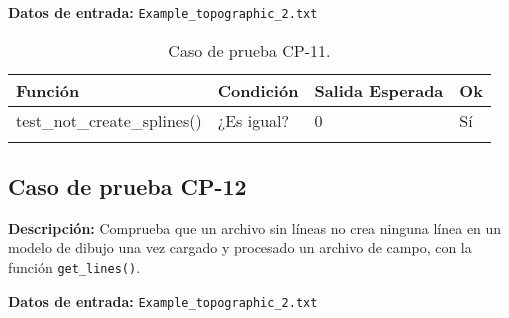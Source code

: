 \textbf{Datos de entrada:} \texttt{Example\_topographic\_2.txt}


\begin{longtable}[]{@{}llll@{}}
\toprule
\begin{minipage}[b]{0.6\columnwidth}\raggedright\strut
Función\strut
\end{minipage} & \begin{minipage}[b]{0.20\columnwidth}\raggedright\strut
Condición\strut
\end{minipage} & \begin{minipage}[b]{0.15\columnwidth}\raggedright\strut
Salida Esperada\strut
\end{minipage} & \begin{minipage}[b]{0.05\columnwidth}\raggedright\strut
Ok\strut
\end{minipage}\tabularnewline
\midrule
\endhead
\begin{minipage}[t]{0.6\columnwidth}\raggedright\strut
\small{test\_not\_create\_splines()}\strut
\end{minipage} & \begin{minipage}[t]{0.20\columnwidth}\raggedright\strut
¿Es igual?\strut
\end{minipage} & \begin{minipage}[t]{0.15\columnwidth}\raggedright\strut
0\strut
\end{minipage} & \begin{minipage}[t]{0.05\columnwidth}\raggedright\strut
Sí\strut
\end{minipage}\tabularnewline

\bottomrule
\caption{Caso de prueba CP-11.}
\end{longtable}

\subsection{Caso de prueba CP-12}

\textbf{Descripción:} Comprueba que un archivo sin líneas no crea ninguna línea en un modelo de dibujo una vez cargado y procesado un archivo de campo, con la función \texttt{get\_lines()}.

\textbf{Datos de entrada:} \texttt{Example\_topographic\_2.txt}


